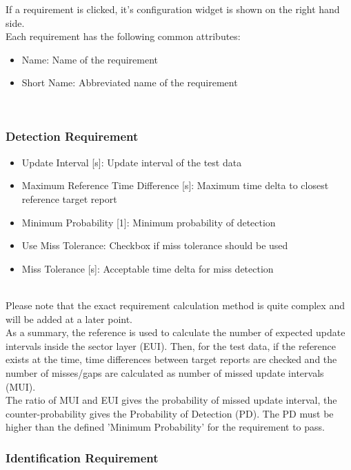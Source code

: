 If a requirement is clicked, it's configuration widget is shown on the right hand side. \\

Each requirement has the following common attributes:
\begin{itemize}  
\item Name: Name of the requirement
\item Short Name: Abbreviated name of the requirement
\end{itemize}
\ \\

\subsubsection{Detection Requirement}

\begin{itemize}  
\item Update Interval [s]: Update interval of the test data
\item Maximum Reference Time Difference [s]: Maximum time delta to closest reference target report
\item Minimum Probability [1]: Minimum probability of detection
\item Use Miss Tolerance: Checkbox if miss tolerance should be used
\item Miss Tolerance [s]: Acceptable time delta for miss detection
\end{itemize}
\ \\

Please note that the exact requirement calculation method is quite complex and will be added at a later point. \\

As a summary, the reference is used to calculate the number of expected update intervals inside the sector layer (EUI). Then, for the test data, if the reference exists at the time, time differences between target reports are checked and the number of misses/gaps are calculated as number of missed update intervals (MUI). \\

The ratio of MUI and EUI gives the probability of missed update interval, the counter-probability gives the Probability of Detection (PD). The PD must be higher than the defined 'Minimum Probability' for the requirement to pass.

\subsubsection{Identification Requirement}

